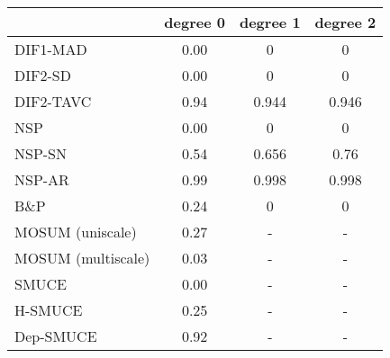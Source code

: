 \begin{tabular}{|l|c|c|c|}
  \hline
 & degree 0 & degree 1 & degree 2 \\ 
  \hline
DIF1-MAD & 0.00 & 0 & 0 \\ 
  DIF2-SD & 0.00 & 0 & 0 \\ 
  DIF2-TAVC & 0.94 & 0.944 & 0.946 \\ 
  NSP & 0.00 & 0 & 0 \\ 
  NSP-SN & 0.54 & 0.656 & 0.76 \\ 
  NSP-AR & 0.99 & 0.998 & 0.998 \\ 
  B\&P & 0.24 & 0 & 0 \\ 
  MOSUM (uniscale) & 0.27 & - & - \\ 
  MOSUM (multiscale) & 0.03 & - & - \\ 
  SMUCE & 0.00 & - & - \\ 
  H-SMUCE & 0.25 & - & - \\ 
  Dep-SMUCE & 0.92 & - & - \\ 
   \hline
\end{tabular}
